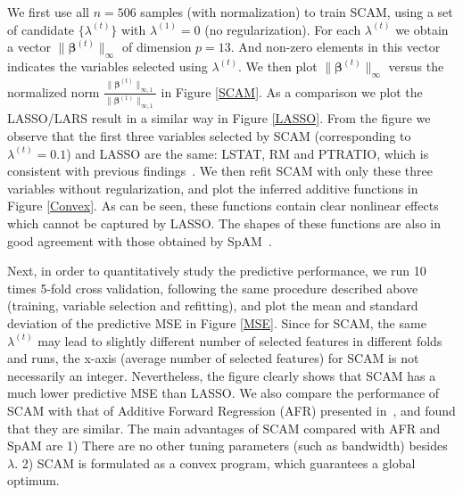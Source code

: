 \documentclass{article} %
\newcommand{\bds}[1]{\boldsymbol{#1}}
\begin{document}
We first use all $n=506$ samples (with normalization) to train SCAM, using
a set of candidate $\{\lambda^{(t)}\}$ with $\lambda^{(1)}=0$ (no regularization). For each $\lambda^{(t)}$
we obtain a vector $\|\bds{\beta}^{(t)}\|_{\infty}$ of dimension $p=13$. And non-zero
elements in this vector indicates the variables selected using $\lambda^{(t)}$. 
We then plot $\|\bds{\beta}^{(t)}\|_{\infty}$ versus the normalized
norm $\frac{\|\bds{\beta}^{(t)}\|_{\infty,1}}{\|\bds{\beta}^{(1)}\|_{\infty,1}}$ in Figure \ref{SCAM}.
As a comparison we plot the LASSO/LARS result in a similar way in Figure \ref{LASSO}.
From the figure we observe that the first three variables selected by SCAM (corresponding to $\lambda^{(t)}=0.1$) 
and LASSO are the same: LSTAT, RM and PTRATIO, which is consistent with previous findings~\cite{?}.
We then refit SCAM with only these three variables without regularization, and plot the inferred additive
functions in Figure \ref{Convex}. As can be seen, these functions contain clear nonlinear effects which cannot be captured
by LASSO. The shapes of these functions are also in good agreement with those obtained by SpAM~\cite{?}.


Next, in order to quantitatively  study the predictive performance, we run 10 times 5-fold cross validation, following
the same procedure described above (training, variable selection and refitting), and plot the mean and standard
deviation of the predictive MSE in Figure \ref{MSE}. Since for SCAM, the same $\lambda^{(t)}$ may lead to
slightly different number of selected features in different folds and runs, the x-axis (average number of selected features)
for SCAM is not necessarily an integer. Nevertheless, the figure clearly shows that SCAM has a much lower predictive MSE than LASSO. 
We also compare the performance of SCAM with that of Additive Forward Regression (AFR) presented in~\cite{Xi}, and found that they are similar.
The main advantages of SCAM compared with AFR and SpAM are 1) There are no other tuning parameters (such as bandwidth)
besides $\lambda$. 2) SCAM is formulated as a convex program, which guarantees a global optimum.
\end{document}
